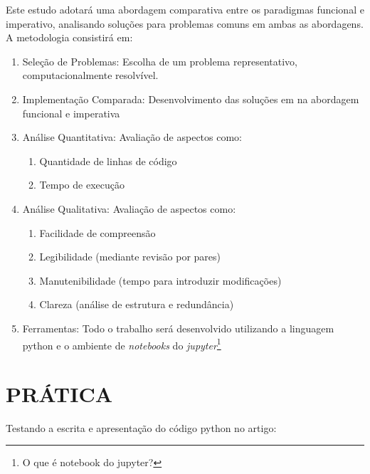 \documentclass[date,twocolumn,a4paper]{ppgem}
\begin{document}
Este estudo adotará uma abordagem comparativa entre os paradigmas funcional e imperativo, analisando soluções para problemas comuns em ambas as abordagens. A metodologia consistirá em:
\begin{enumerate}
    \item Seleção de Problemas: Escolha de um problema representativo, computacionalmente resolvível.
    \item Implementação Comparada: Desenvolvimento das soluções em na abordagem funcional e imperativa
    \item Análise Quantitativa: Avaliação de aspectos como:
    \begin{enumerate}
        \item Quantidade de linhas de código
        \item Tempo de execução
    \end{enumerate}
    \item Análise Qualitativa: Avaliação de aspectos como:
    \begin{enumerate}
        \item Facilidade de compreensão
        \item Legibilidade (mediante revisão por pares)
        \item Manutenibilidade (tempo para introduzir modificações)
        \item Clareza (análise de estrutura e redundância)
    \end{enumerate}
    \item Ferramentas: Todo o trabalho será desenvolvido utilizando a linguagem python
        e o ambiente de \textit{notebooks} do \textit{jupyter}\footnote{O que é notebook do jupyter?}
\end{enumerate}




\renewcommand{\listingscaption}{Código}

\section{PRÁTICA}

Testando a escrita e apresentação do código python no artigo:

\end{document}
